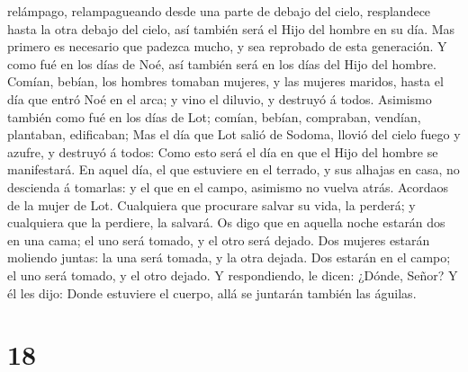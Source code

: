 relámpago, relampagueando desde una parte de debajo del cielo,
resplandece hasta la otra debajo del cielo, así también será el Hijo del
hombre en su día.  Mas primero es necesario que padezca
mucho, y sea reprobado de esta generación.  Y como fué en
los días de Noé, así también será en los días del Hijo del hombre.
 Comían, bebían, los hombres tomaban mujeres, y las
mujeres maridos, hasta el día que entró Noé en el arca; y vino el
diluvio, y destruyó á todos.  Asimismo también como fué
en los días de Lot; comían, bebían, compraban, vendían, plantaban,
edificaban;  Mas el día que Lot salió de Sodoma, llovió
del cielo fuego y azufre, y destruyó á todos:  Como esto
será el día en que el Hijo del hombre se manifestará.  En
aquel día, el que estuviere en el terrado, y sus alhajas en casa, no
descienda á tomarlas: y el que en el campo, asimismo no vuelva atrás.
 Acordaos de la mujer de Lot.  Cualquiera
que procurare salvar su vida, la perderá; y cualquiera que la perdiere,
la salvará.  Os digo que en aquella noche estarán dos en
una cama; el uno será tomado, y el otro será dejado.  Dos
mujeres estarán moliendo juntas: la una será tomada, y la otra dejada.
 Dos estarán en el campo; el uno será tomado, y el otro
dejado.  Y respondiendo, le dicen: ¿Dónde, Señor? Y él
les dijo: Donde estuviere el cuerpo, allá se juntarán también las
águilas.

\hypertarget{section-17}{%
\section{18}\label{section-17}}

